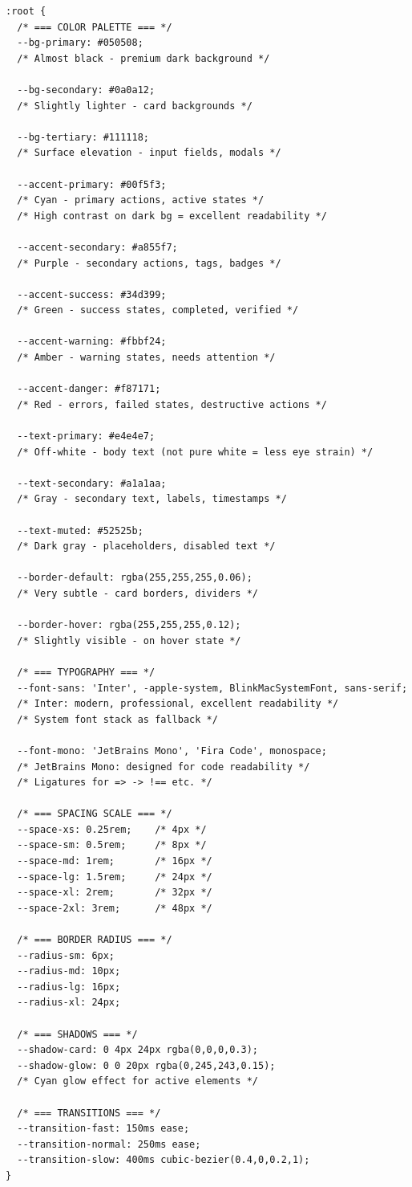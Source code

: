 \documentclass[11pt,a4paper,twoside]{report}
\begin{document}
\begin{lstlisting}[style=jsstyle,caption={index.css --- Complete Design Token System}]
:root {
  /* === COLOR PALETTE === */
  --bg-primary: #050508;
  /* Almost black - premium dark background */

  --bg-secondary: #0a0a12;
  /* Slightly lighter - card backgrounds */

  --bg-tertiary: #111118;
  /* Surface elevation - input fields, modals */

  --accent-primary: #00f5f3;
  /* Cyan - primary actions, active states */
  /* High contrast on dark bg = excellent readability */

  --accent-secondary: #a855f7;
  /* Purple - secondary actions, tags, badges */

  --accent-success: #34d399;
  /* Green - success states, completed, verified */

  --accent-warning: #fbbf24;
  /* Amber - warning states, needs attention */

  --accent-danger: #f87171;
  /* Red - errors, failed states, destructive actions */

  --text-primary: #e4e4e7;
  /* Off-white - body text (not pure white = less eye strain) */

  --text-secondary: #a1a1aa;
  /* Gray - secondary text, labels, timestamps */

  --text-muted: #52525b;
  /* Dark gray - placeholders, disabled text */

  --border-default: rgba(255,255,255,0.06);
  /* Very subtle - card borders, dividers */

  --border-hover: rgba(255,255,255,0.12);
  /* Slightly visible - on hover state */

  /* === TYPOGRAPHY === */
  --font-sans: 'Inter', -apple-system, BlinkMacSystemFont, sans-serif;
  /* Inter: modern, professional, excellent readability */
  /* System font stack as fallback */

  --font-mono: 'JetBrains Mono', 'Fira Code', monospace;
  /* JetBrains Mono: designed for code readability */
  /* Ligatures for => -> !== etc. */

  /* === SPACING SCALE === */
  --space-xs: 0.25rem;    /* 4px */
  --space-sm: 0.5rem;     /* 8px */
  --space-md: 1rem;       /* 16px */
  --space-lg: 1.5rem;     /* 24px */
  --space-xl: 2rem;       /* 32px */
  --space-2xl: 3rem;      /* 48px */

  /* === BORDER RADIUS === */
  --radius-sm: 6px;
  --radius-md: 10px;
  --radius-lg: 16px;
  --radius-xl: 24px;

  /* === SHADOWS === */
  --shadow-card: 0 4px 24px rgba(0,0,0,0.3);
  --shadow-glow: 0 0 20px rgba(0,245,243,0.15);
  /* Cyan glow effect for active elements */

  /* === TRANSITIONS === */
  --transition-fast: 150ms ease;
  --transition-normal: 250ms ease;
  --transition-slow: 400ms cubic-bezier(0.4,0,0.2,1);
}
\end{lstlisting}
\end{document}
